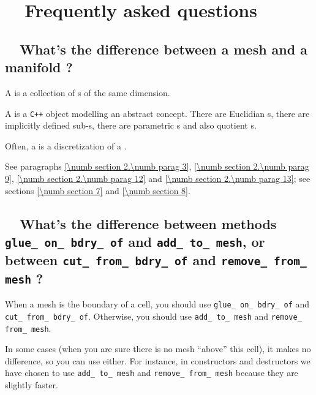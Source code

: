 
\chapter {~~{Frequently asked questions}}\label{\numb section 13}

\section{~~What's the difference between a mesh and a manifold ?}
\label{\numb section 13.\numb parag 1}

A {\small\tt{}} is a collection of {\small\tt{}}s of the
same dimension.

A {\small\tt{}} is a {\tt C++} object modelling an abstract concept.
There are Euclidian {\small\tt{}}s, there are implicitly defined
sub-{\small\tt{}}s, there are parametric {\small\tt{}}s
and also quotient {\small\tt{}}s.

Often, a {\small\tt{}} is a discretization of a {\small\tt{}}.

See paragraphs \ref{\numb section 2.\numb parag 3}, \ref{\numb section 2.\numb parag 9},
\ref{\numb section 2.\numb parag 12} and \ref{\numb section 2.\numb parag 13};
see sections \ref{\numb section 7} and \ref{\numb section 8}.


\section{~~What's the difference between methods {\small\tt glue\_\,on\_\,bdry\_\,of} and
  {\small\tt add\_\,to\_\,mesh}, or between {\small\tt cut\_\,from\_\,bdry\_\,of} and
  {\small\tt remove\_\,from\_\,mesh} ?}
\label{\numb section 13.\numb parag 2}

When a mesh is the boundary of a cell, you should use {\small\tt glue\_\,on\_\,bdry\_\,of} and
{\small\tt cut\_\,from\_\,bdry\_\,of}.
Otherwise, you should use {\small\tt add\_\,to\_\,mesh} and {\small\tt remove\_\,from\_\,mesh}.

In some cases (when you are sure there is no mesh ``above'' this cell), it makes no difference,
so you can use either.
For instance, in {\small\tt{}} constructors and destructors
we have chosen to use {\small\tt add\_\,to\_\,mesh} and {\small\tt remove\_\,from\_\,mesh}
because they are slightly faster.


